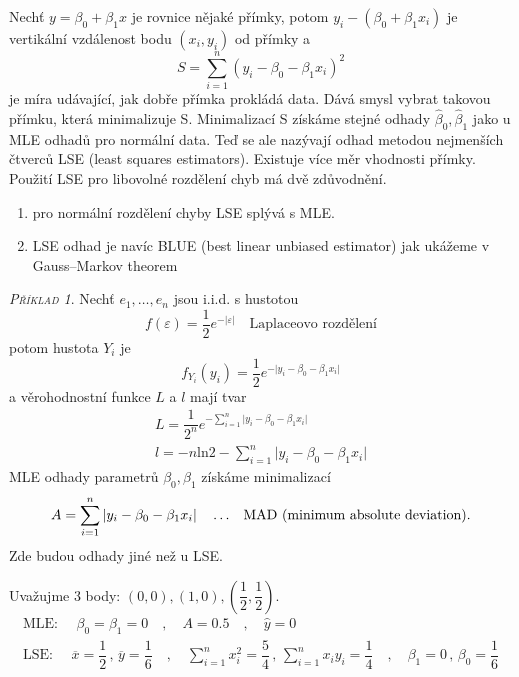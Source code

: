 \documentclass[oneside,intlimits,reqno]{scrbook}
\renewcommand{\epsilon}{\varepsilon}
\theoremstyle{definition}
\theoremstyle{plain}
\theoremstyle{remark}
\newtheorem{example}[define]{\textsc{Příklad}}
\begin{document}
Nechť $ y = \beta_{0} + \beta_{1} x  $ je rovnice nějaké přímky, potom $ y_{i} - (\beta_{0} + \beta_{1} x_{i}) $ je vertikální vzdálenost bodu $ (x_{i},y_{i}) $ od přímky a 
\begin{equation}
 S = \sum_{i=1}^{n} (y_{i} - \beta_{0} - \beta_{1} x_{i})^{2}
\end{equation}
je míra udávající, jak dobře přímka prokládá data. Dává smysl vybrat takovou přímku, která minimalizuje S. Minimalizací S získáme stejné odhady $  \widehat{\beta}_{0}, \widehat{\beta}_{1} $ jako u MLE odhadů pro normální data. Teď se ale nazývají odhad metodou nejmenších čtverců LSE (least squares estimators).
Existuje více měr vhodnosti přímky. Použití LSE pro libovolné rozdělení chyb má dvě zdůvodnění.
\begin{enumerate}
  \item pro normální rozdělení chyby LSE splývá s MLE.
  \item LSE odhad je navíc BLUE (best linear unbiased estimator) jak ukážeme v Gauss–Markov theorem
\end{enumerate}

\begin{example}
Nechť $ e_{1}, \dots , e_{n} $ jsou i.i.d. s hustotou
\begin{equation*}
  f(\epsilon) = \dfrac{1}{2} e ^{- \vert \epsilon \vert} \quad \text{Laplaceovo rozdělení}
\end{equation*}
potom hustota $ Y_{i} $ je 
\begin{equation*}
  f_{Y_{i}}(y_{i}) = \dfrac{1}{2} e ^{- \vert y_{i} - \beta_{0} - \beta_{1} x_{i} \vert} 
\end{equation*}
a věrohodnostní funkce $ L $ a $  l$ mají tvar
\begin{equation*}
\begin{aligned}
  L = \dfrac{1}{2^{n}} e ^{- \sum_{i=1}^{n} \vert y_{i} - \beta_{0} - \beta_{1} x_{i} \vert}  \\
  l = -n \text{ln} 2 - \sum_{i=1}^{n} \vert y_{i} - \beta_{0} - \beta_{1} x_{i} \vert 
\end{aligned} 
\end{equation*}
MLE odhady parametrů $ \beta_{0} , \beta_{1} $ získáme minimalizací
\begin{equation}
A = \sum_{i=1}^{n} \vert y_{i} - \beta_{0} - \beta_{1} x_{i} \vert \quad \dots \text{ \, MAD (minimum absolute deviation).}
\end{equation}
Zde budou odhady jiné než u LSE.

Uvažujme 3 body: $ (0,0) , (1,0) , (\dfrac{1}{2},\dfrac{1}{2}) $.
\begin{equation}
\begin{aligned}
\text{MLE: } \quad  \beta_{0} = \beta_{1} = 0 \quad , \quad A = 0.5
 \quad , \quad \widehat{y} = 0 \\
 \text{LSE: } \quad \overline{x} = \dfrac{1}{2} \, , \, \overline{y} = \dfrac{1}{6} \quad , \quad \sum_{i=1}^{n} x_{i}^{2} = \dfrac{5}{4} \, , \, \sum_{i=1}^{n} x_{i} y_{i} = \dfrac{1}{4} \quad , \quad \beta_{1} = 0 \, , \, \beta_{0} = \dfrac{1}{6}
  \end{aligned}  
\end{equation}
\end{example}
\end{document}
